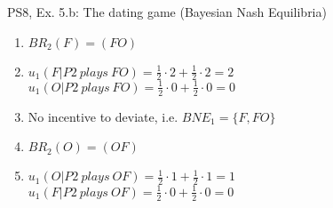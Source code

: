 \begin{frame}{PS8, Ex. 5.b: The dating game (Bayesian Nash Equilibria)}
\begin{multicols}{2}
      \vfill\null\columnbreak
      \begin{enumerate}
        \item[1.a:] $BR_2(F)=(FO)$
        \item[1.b:] $u_1(F|P2\ plays\ FO)=\frac{1}{2}\cdot2+\frac{1}{2}\cdot2=2$\\
                    $u_1(O|P2\ plays\ FO)=\frac{1}{2}\cdot0+\frac{1}{2}\cdot0=0$
        \item[1.c:] No incentive to deviate, i.e. $BNE_1=\{F,FO\}$
        \item[2.a:] $BR_2(O)=(OF)$
        \item[2.b:] $u_1(O|P2\ plays\ OF)=\frac{1}{2}\cdot1+\frac{1}{2}\cdot1=1$\\
                    $u_1(F|P2\ plays\ OF)=\frac{1}{2}\cdot0+\frac{1}{2}\cdot0=0$
      \end{enumerate}
      \vfill\null
    \end{multicols}
\end{frame}
